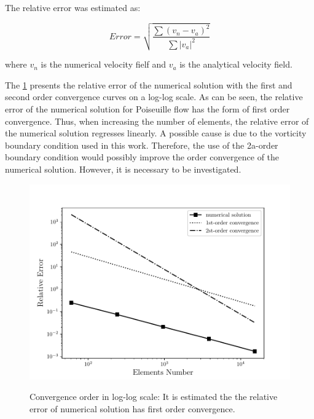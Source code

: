 \noindent
\medskip
The relative error was estimated as:

\begin{equation}
 \mathit{Error} = \sqrt{\frac{\sum{(v_{n} - v_{a})^{2} }}{\sum |v_{a}|^{2} }}
\end{equation}

\noindent
where $v_{n}$ is the numerical velocity fielf and
$v_{a}$ is the analytical velocity field.

\bigskip
The \ref{ordem de convergencia poiseuille} presents the relative error 
of the numerical solution with the first and second order convergence 
curves on a log-log scale. As can be seen, the relative error of 
the numerical solution for Poiseuille flow has the form of 
first order convergence. Thus, when increasing the number of elements, 
the relative error of the numerical solution regresses linearly.
A possible cause is due to the vorticity boundary condition used 
in this work. Therefore, the use of the 2a-order boundary condition
would possibly improve the order convergence of the numerical
solution. However, it is necessary to be investigated. 


\begin{figure}[H]
     \centering
     \includegraphics[scale=1]{./02_chaps/cap_validation/figure/poiseuille_error.pdf}\\
     \medskip
     \caption{Convergence order in log-log scale:
It is estimated the the relative error of numerical solution has
first order convergence.}
     \label{ordem de convergencia poiseuille}
\end{figure}


